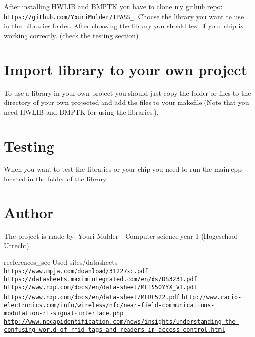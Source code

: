 After installing H\+W\+L\+IB and B\+M\+P\+TK you have to clone my github repo\+: \href{https://github.com/YouriMulder/IPASS_2018}{\tt https\+://github.\+com/\+Youri\+Mulder/\+I\+P\+A\+S\+S\+\_}. Choose the library you want to use in the Libraries folder. After choosing the library you should test if your chip is working correctly. (check the testing section)\hypertarget{index_import_sec}{}\section{Import library to your own project}\label{index_import_sec}
To use a library in your own project you should just copy the folder or files to the directory of your own projected and add the files to your makefile (Note that you need H\+W\+L\+IB and B\+M\+P\+TK for using the libraries!).\hypertarget{index_test_sec}{}\section{Testing}\label{index_test_sec}
When you want to test the libraries or your chip you need to run the main.\+cpp located in the folder of the library.\hypertarget{index_author_sec}{}\section{Author}\label{index_author_sec}
The project is made by\+: Youri Mulder -\/ Computer science year 1 (Hogeschool Utrecht)

reeferences\+\_\+sec Used sites/datasheets \href{https://www.mpja.com/download/31227sc.pdf}{\tt https\+://www.\+mpja.\+com/download/31227sc.\+pdf} \href{https://datasheets.maximintegrated.com/en/ds/DS3231.pdf}{\tt https\+://datasheets.\+maximintegrated.\+com/en/ds/\+D\+S3231.\+pdf} \href{https://www.nxp.com/docs/en/data-sheet/MF1S50YYX_V1.pdf}{\tt https\+://www.\+nxp.\+com/docs/en/data-\/sheet/\+M\+F1\+S50\+Y\+Y\+X\+\_\+\+V1.\+pdf} \href{https://www.nxp.com/docs/en/data-sheet/MFRC522.pdf}{\tt https\+://www.\+nxp.\+com/docs/en/data-\/sheet/\+M\+F\+R\+C522.\+pdf} \href{http://www.radio-electronics.com/info/wireless/nfc/near-field-communications-modulation-rf-signal-interface.php}{\tt http\+://www.\+radio-\/electronics.\+com/info/wireless/nfc/near-\/field-\/communications-\/modulation-\/rf-\/signal-\/interface.\+php} \href{http://www.nedapidentification.com/news/insights/understanding-the-confusing-world-of-rfid-tags-and-readers-in-access-control.html}{\tt http\+://www.\+nedapidentification.\+com/news/insights/understanding-\/the-\/confusing-\/world-\/of-\/rfid-\/tags-\/and-\/readers-\/in-\/access-\/control.\+html} 